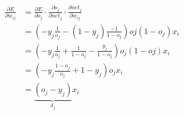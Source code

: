 \begin{frame}
  \begin{equation*}
    \begin{split}
      \frac{\partial E}{\partial w_{ij}} & = \frac{\partial E}{\partial o_j}
    \cdot \frac{\partial o_j}{\partial net_j} \cdot \frac{\partial
    net_j}{\partial w_{ij}} \\
    & = (-y_j \frac{1}{o_j} - (1 - y_j) \frac{-1}{1 - o_j}) oj(1 - o_j) x_i \\
    & = (-y_j \frac{1}{o_j} + \frac{1}{1 - o_j} - \frac{y_j}{1 - o_j}) o_j(1 - oj) x_i \\
    & = (-y_j \frac{1 - o_j}{o_j} + 1 - y_j) o_j x_i \\
    & = \underbrace{(o_j - y_j)}_{\delta_j} x_i \\
  \end{split}
\end{equation*}
\end{frame}


